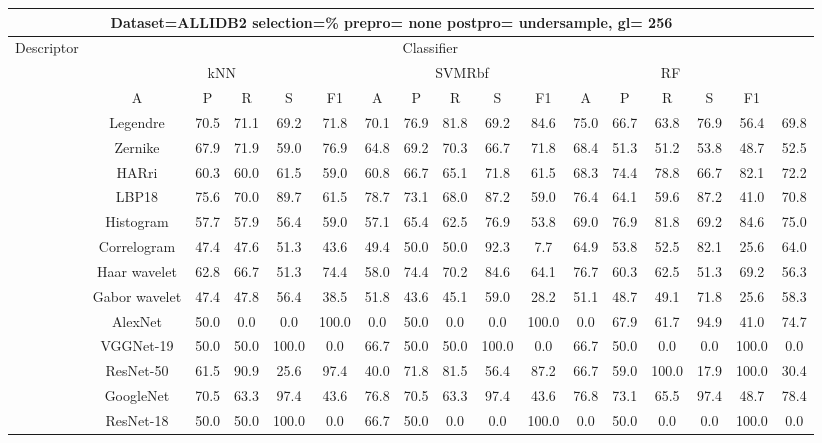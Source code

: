 \documentclass[12pt,italian]{article}
\begin{document}
\begin{tiny}
\begin{longtable}{lcccccccccccccccc}
\toprule
\multicolumn{16}{c}{Dataset=ALLIDB2 selection=\% prepro= none postpro= undersample, gl= 256} \\ 
\toprule
Descriptor & \multicolumn{15}{c}{Classifier} \\ 
& \multicolumn{5}{c}{kNN} & \multicolumn{5}{c}{SVMRbf} & \multicolumn{5}{c}{RF} \\ 
& A & P & R & S & F1 & A & P & R & S & F1 & A & P & R & S & F1 \\ 
\midrule
& Legendre & 70.5 & 71.1 & 69.2 & 71.8 & 70.1 & 76.9 & 81.8 & 69.2 & 84.6 & 75.0 & 66.7 & 63.8 & 76.9 & 56.4 & 69.8 \\ 
& Zernike & 67.9 & 71.9 & 59.0 & 76.9 & 64.8 & 69.2 & 70.3 & 66.7 & 71.8 & 68.4 & 51.3 & 51.2 & 53.8 & 48.7 & 52.5 \\ 
& HARri & 60.3 & 60.0 & 61.5 & 59.0 & 60.8 & 66.7 & 65.1 & 71.8 & 61.5 & 68.3 & 74.4 & 78.8 & 66.7 & 82.1 & 72.2 \\ 
& LBP18 & 75.6 & 70.0 & 89.7 & 61.5 & 78.7 & 73.1 & 68.0 & 87.2 & 59.0 & 76.4 & 64.1 & 59.6 & 87.2 & 41.0 & 70.8 \\ 
& Histogram & 57.7 & 57.9 & 56.4 & 59.0 & 57.1 & 65.4 & 62.5 & 76.9 & 53.8 & 69.0 & 76.9 & 81.8 & 69.2 & 84.6 & 75.0 \\ 
& Correlogram & 47.4 & 47.6 & 51.3 & 43.6 & 49.4 & 50.0 & 50.0 & 92.3 &  7.7 & 64.9 & 53.8 & 52.5 & 82.1 & 25.6 & 64.0 \\ 
& Haar wavelet & 62.8 & 66.7 & 51.3 & 74.4 & 58.0 & 74.4 & 70.2 & 84.6 & 64.1 & 76.7 & 60.3 & 62.5 & 51.3 & 69.2 & 56.3 \\ 
& Gabor wavelet & 47.4 & 47.8 & 56.4 & 38.5 & 51.8 & 43.6 & 45.1 & 59.0 & 28.2 & 51.1 & 48.7 & 49.1 & 71.8 & 25.6 & 58.3 \\ 
& AlexNet & 50.0 &  0.0 &  0.0 & 100.0 &  0.0 & 50.0 &  0.0 &  0.0 & 100.0 &  0.0 & 67.9 & 61.7 & 94.9 & 41.0 & 74.7 \\ 
& VGGNet-19 & 50.0 & 50.0 & 100.0 &  0.0 & 66.7 & 50.0 & 50.0 & 100.0 &  0.0 & 66.7 & 50.0 &  0.0 &  0.0 & 100.0 &  0.0 \\ 
& ResNet-50 & 61.5 & 90.9 & 25.6 & 97.4 & 40.0 & 71.8 & 81.5 & 56.4 & 87.2 & 66.7 & 59.0 & 100.0 & 17.9 & 100.0 & 30.4 \\ 
& GoogleNet & 70.5 & 63.3 & 97.4 & 43.6 & 76.8 & 70.5 & 63.3 & 97.4 & 43.6 & 76.8 & 73.1 & 65.5 & 97.4 & 48.7 & 78.4 \\ 
& ResNet-18 & 50.0 & 50.0 & 100.0 &  0.0 & 66.7 & 50.0 &  0.0 &  0.0 & 100.0 &  0.0 & 50.0 &  0.0 &  0.0 & 100.0 &  0.0 \\ 

\end{longtable}
\end{tiny}
\end{document}
